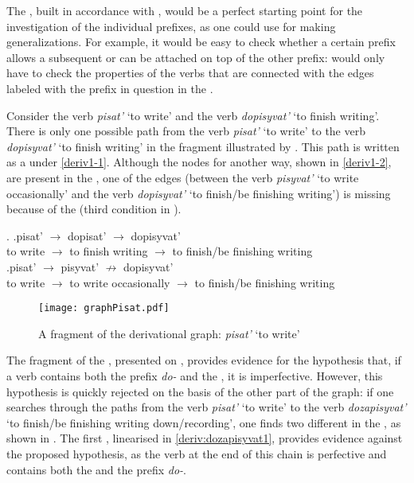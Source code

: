 The , built in accordance with , would be a perfect starting point for the investigation of the individual prefixes, as one could use  for making generalizations. For example, it would be easy to check whether a certain prefix allows a subsequent  or can be attached on top of the other prefix: would only have to check the properties of the verbs that are connected with the edges labeled with the prefix in question in the . 

Consider the verb \textit{pisat'} `to write' and the verb \textit{dopisyvat'} `to finish writing'. There is only one possible path from the verb \textit{pisat'} `to write' to the verb \textit{dopisyvat'} `to finish writing' in the  fragment illustrated by . This path is written as a  under \ref{deriv1-1}. Although the nodes for another way, shown in \ref{deriv1-2}, are present in the , one of the edges (between the verb \textit{pisyvat'} `to write occasionally' and the verb \textit{dopisyvat'} `to finish/be finishing writing') is missing because of the  (third condition in ).

\ex.\label{deriv1} \ag.\label{deriv1-1}pisat'\textsuperscript{\IPF} $\rightarrow$ dopisat'\textsuperscript{\PF} $\rightarrow$ dopisyvat'\textsuperscript{\IPF}\\
{to write} $\rightarrow$ {to finish writing} $\rightarrow$ {to finish/be finishing writing}\\
\bg.\label{deriv1-2}pisat'\textsuperscript{\IPF} $\rightarrow$ pisyvat'\textsuperscript{\IPF} $\nrightarrow$ dopisyvat'\\
{to write} $\rightarrow$ {to write occasionally} $\rightarrow$ {to finish/be finishing writing}\\

\begin{figure}
\texttt{[image: graphPisat.pdf]}
\caption{A fragment of the derivational graph: \textit{pisat'} `to write'\label{tree:dopisyvat}}
\end{figure}

The fragment of the , presented on , provides evidence for the hypothesis that, if a verb contains both the prefix \textit{do-} and the , it is imperfective. However, this hypothesis is quickly rejected on the basis of the other part of the graph: if one searches through the paths from the verb \textit{pisat'} `to write' to the verb \textit{dozapisyvat'} `to finish/be finishing writing down/recording', one finds two different  in the , as shown in . The first , linearised in \ref{deriv:dozapisyvat1}, provides evidence against the proposed hypothesis, as the verb at the end of this chain is perfective and contains both the  and the prefix \textit{do-}. 

